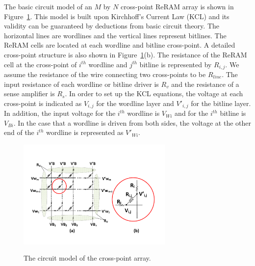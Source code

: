 The basic circuit model of an $M$ by $N$ cross-point ReRAM array is shown
in Figure~\ref{fig:modeling}. This model is built upon Kirchhoff's Current
Law (KCL) and its validity can be guaranteed by deductions from basic
circuit theory. The horizontal lines are wordlines and the vertical lines
represent bitlines. The ReRAM cells are located at each wordline and
bitline cross-point. A detailed cross-point structure is also shown in
Figure~\ref{fig:modeling}(b). The resistance of the ReRAM cell at the
cross-point of $i^{th}$ wordline and $j^{th}$ bitline is represented by
$R_{i,j}$. We assume the resistance of the wire connecting two
cross-points to be $R_{line}$. The input resistance of each wordline or
bitline driver is $R_v$ and the resistance of a sense amplifier is $R_s$.
In order to set up the KCL equations, the voltage at each cross-point is
indicated as $V_{i,j}$ for the wordline layer and $V'_{i,j}$ for the
bitline layer. In addition, the input voltage for the $i^{th}$ wordline is
$V_{Wi}$ and for the $i^{th}$ bitline is $V_{Bi}$. In the case that a
wordline is driven from both sides, the voltage at the other end of the
$i^{th}$ wordline is represented as $V'_{Wi}$.


\begin{figure}%
\centering
  \includegraphics[width=3in]{./figures/model_f.pdf}\\
  \vspace{-8pt}
  \caption{The circuit model of the cross-point array.}\label{fig:modeling}
  \vspace{-4pt}
\end{figure}

